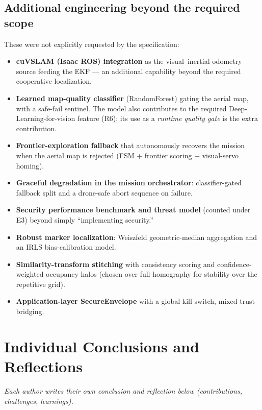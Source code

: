 \documentclass[11pt]{article}
\begin{document}
\subsection{Additional engineering beyond the required scope}
These were not explicitly requested by the specification:
\begin{itemize}[leftmargin=1.6em]
  \item \textbf{cuVSLAM (Isaac ROS) integration} as the visual--inertial odometry
        source feeding the EKF --- an additional capability beyond the required
        cooperative localization.
  \item \textbf{Learned map-quality classifier} (RandomForest) gating the aerial
        map, with a safe-fail sentinel. The model also contributes to the required
        Deep-Learning-for-vision feature (R6); its use as a \emph{runtime quality
        gate} is the extra contribution.
  \item \textbf{Frontier-exploration fallback} that autonomously recovers the
        mission when the aerial map is rejected (FSM + frontier scoring +
        visual-servo homing).
  \item \textbf{Graceful degradation in the mission orchestrator}: classifier-gated
        fallback split and a drone-safe abort sequence on failure.
  \item \textbf{Security performance benchmark and threat model} (counted under
        E3) beyond simply ``implementing security.''
  \item \textbf{Robust marker localization}: Weiszfeld geometric-median
        aggregation and an IRLS bias-calibration model.
  \item \textbf{Similarity-transform stitching} with consistency scoring and
        confidence-weighted occupancy halos (chosen over full homography for
        stability over the repetitive grid).
  \item \textbf{Application-layer SecureEnvelope} with a global kill switch,
        mixed-trust bridging.
\end{itemize}

\section{Individual Conclusions and Reflections}
\emph{Each author writes their own conclusion and reflection below
(contributions, challenges, learnings).}
\end{document}
